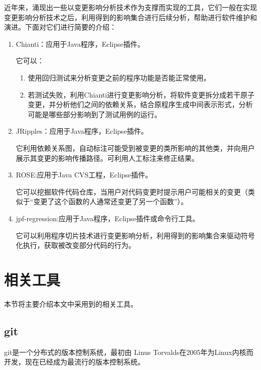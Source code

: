 近年来，涌现出一些以变更影响分析技术作为支撑而实现的工具，它们一般在实现变更影响分析技术之后，利用得到的影响集合进行后续分析，帮助进行软件维护和演进。下面对它们进行简要的介绍：
\begin{enumerate}
	\item Chianti：应用于Java程序，Eclipse插件\cite{ren2004chianti}。

	它可以：
	\begin{enumerate}
	
		\item 使用回归测试来分析变更之前的程序功能是否能正常使用。
		\item 若测试失败，利用Chianti进行变更影响分析，将软件变更拆分成若干原子变更，并分析他们之间的依赖关系，结合原程序生成中间表示形式，分析可能是哪些部分影响到了测试用例的运行。
	\end{enumerate}
	
	
	\item JRipples：应用于Java程序，Eclipse插件\cite{buckner2005jripples,rajlich2004incremental}。
	
	它利用依赖关系图，自动标注可能受到被变更的类所影响的其他类，并向用户展示其变更的影响传播路径。可利用人工标注来修正结果。
	
	\item ROSE:应用于Java CVS工程，Eclipse插件\cite{zimmermann2005mining}。

	它可以挖掘软件代码仓库，当用户对代码变更时提示用户可能相关的变更（类似于“变更了这个函数的人通常还变更了另一个函数”）。
	
	
	\item jpf-regression:应用于Java程序，Eclipse插件或命令行工具\cite{person2011directed}。

	它可以利用程序切片技术进行变更影响分析，利用得到的影响集合来驱动符号化执行，获取被改变部分代码的行为。
\end{enumerate}



\section{相关工具}
	本节将主要介绍本文中采用到的相关工具。
	

	\subsection{git}		

git是一个分布式的版本控制系统，最初由 Linus Torvalds在2005年为Linux内核而开发，现在已经成为最流行的版本控制系统。

